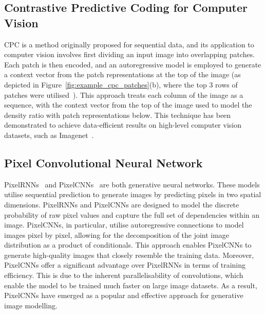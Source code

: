 \subsection{Contrastive Predictive Coding for Computer Vision}
\label{subsec:unsupervised_cpc_for_vision}
CPC is a method originally proposed for sequential data, and its application to computer vision involves first dividing an input image into overlapping patches. Each patch is then encoded, and an autoregressive model is employed to generate a context vector from the patch representations at the top of the image (as depicted in Figure~\ref{fig:example_cpc_patches}(b), where the top 3 rows of patches were utilised~\citep{oord2018representation}). This approach treats each column of the image as a sequence, with the context vector from the top of the image used to model the density ratio with patch representations below. This technique has been demonstrated to achieve data-efficient results on high-level computer vision datasets, such as Imagenet~\citep{deng2009imagenet}.

\subsection{Pixel Convolutional Neural Network}
\label{subsec:pixelcnn}
PixelRNNs~\citep{van2016pixel} and PixelCNNs~\citep{oord2016pixel} are both generative neural networks. These models utilise sequential prediction to generate images by predicting pixels in two spatial dimensions. PixelRNNs and PixelCNNs are designed to model the discrete probability of raw pixel values and capture the full set of dependencies within an image. PixelCNNs, in particular, utilise autoregressive connections to model images pixel by pixel, allowing for the decomposition of the joint image distribution as a product of conditionals. This approach enables PixelCNNs to generate high-quality images that closely resemble the training data. Moreover, PixelCNNs offer a significant advantage over PixelRNNs in terms of training efficiency. This is due to the inherent parallelisability of convolutions, which enable the model to be trained much faster on large image datasets. As a result, PixelCNNs have emerged as a popular and effective approach for generative image modelling.

